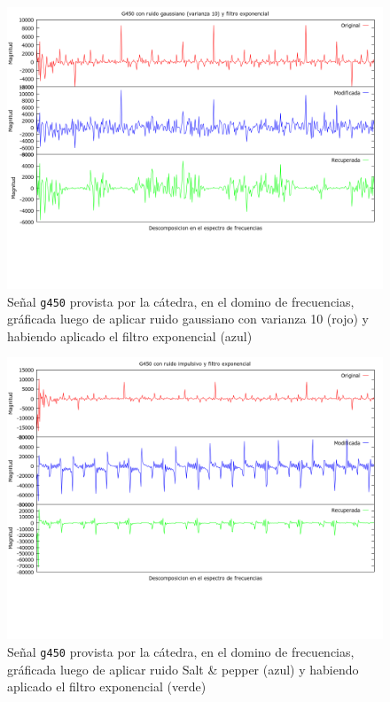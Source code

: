 \begin{figure}[H]
\begin {center}
\includegraphics[width=500pt]{imagenes/g450-gauss-10-exp.png}
\end {center}
\caption{Se\~nal \texttt{g450} provista por la c\'atedra, en el domino de frecuencias, gr\'aficada
luego de aplicar ruido gaussiano con varianza 10 (rojo) y 
habiendo aplicado el filtro exponencial (azul)}
\label{fig:GexpSpec}
\end{figure}

\begin{figure}[H]
\begin {center}
\includegraphics[width=500pt]{imagenes/g450-imp-exp.png}
\end {center}
\caption{Se\~nal \texttt{g450} provista por la c\'atedra, en el domino de frecuencias, gr\'aficada
luego de aplicar ruido Salt & pepper (azul) y habiendo aplicado el filtro exponencial (verde)}
\label{fig:SexpSig}
\end{figure}

